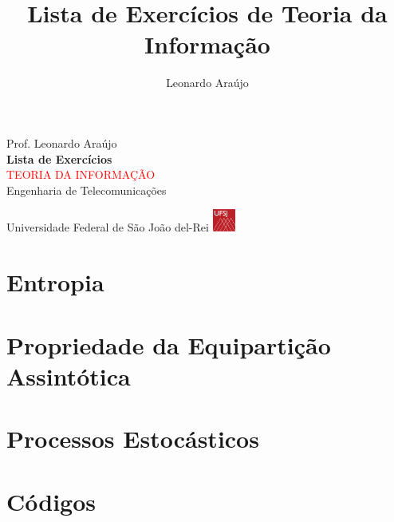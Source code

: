 \documentclass[answers]{exam}
\title{Lista de Exercícios de Teoria da Informação}
\author{Leonardo Araújo}
\newcommand*{\titleTH}{\begingroup%
\raggedleft
\vspace*{\baselineskip}
{\Large Prof. Leonardo Araújo}\\[0.167\textheight]
{\bfseries Lista de Exercícios}\\[\baselineskip]
{\textcolor{Red}{\Huge TEORIA DA INFORMAÇÃO}}\\[\baselineskip]
{\small Engenharia de Telecomunicações}\par
\vfill
{\Large Universidade Federal de São João del-Rei \includegraphics[width=2em]{../images/logoufsj.pdf}}\par
\vspace*{3\baselineskip}
\newpage
\endgroup}
\begin{document}
\titleTH
\tableofcontents

\section{Entropia}































\section{Propriedade da Equipartição Assintótica}










\section{Processos Estocásticos}













\section{Códigos}









\end{document}
